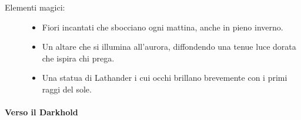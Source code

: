 \documentclass{article}
\begin{document}
\begin{description}
  \item[Elementi magici:]
  \begin{itemize}
    \item Fiori incantati che sbocciano ogni mattina, anche in pieno inverno.
    \item Un altare che si illumina all’aurora, diffondendo una tenue luce dorata che ispira chi prega.
    \item Una statua di Lathander i cui occhi brillano brevemente con i primi raggi del sole.
  \end{itemize}

\end{description}
                    
\paragraph{Verso il Darkhold}
\end{document}
